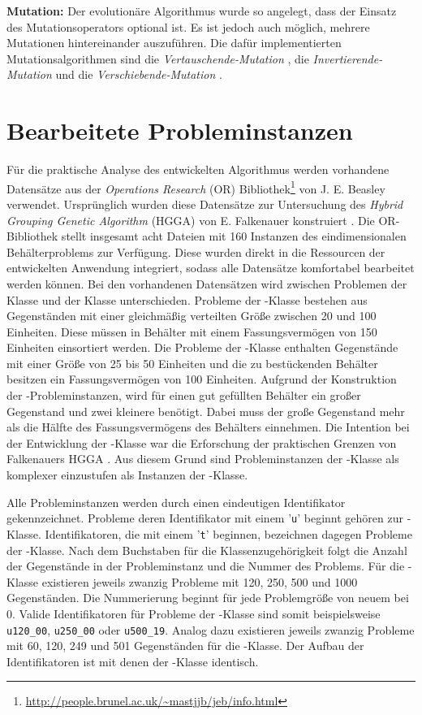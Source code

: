 \textbf{Mutation:} Der evolutionäre Algorithmus wurde so angelegt, dass der Einsatz des Mutationsoperators optional ist. Es ist jedoch auch möglich, mehrere Mutationen hintereinander auszuführen. Die dafür implementierten Mutationsalgorithmen sind die  
\textit{Vertauschende-Mutation} \parencite[27]{Weicker:2007}, die \textit{Invertierende-Mutation} \parencite[28]{Weicker:2007} und die \textit{Ver\-schie\-bende-Mutation} \parencite[132]{Weicker:2007}.


    \section{Bearbeitete Probleminstanzen}
    Für die praktische Analyse des entwickelten Algorithmus werden vorhandene Datensätze aus der \textit{Operations Research} (OR) Bibliothek\footnote{\url{http://people.brunel.ac.uk/~mastjjb/jeb/info.html}} von J. E. Beasley verwendet. Ursprünglich wurden diese Datensätze zur Untersuchung des \textit{Hybrid Grouping Genetic Algorithm} (HGGA) von E. Falkenauer konstruiert \parencite{Falkenauer:1996}. Die OR-Bibliothek stellt insgesamt acht Dateien mit 160 Instanzen des eindimensionalen Behälterproblems zur Verfügung. Diese wurden direkt in die Ressourcen der entwickelten Anwendung integriert, sodass alle Datensätze komfortabel bearbeitet werden können. Bei den vorhandenen Datensätzen wird zwischen Problemen der Klasse \uniform und der Klasse \triplets unterschieden. Probleme der \uniform-Klasse bestehen aus Gegenständen mit einer gleichmäßig verteilten Größe zwischen 20 und 100 Einheiten. Diese müssen in Behälter mit einem Fassungsvermögen von 150 Einheiten einsortiert werden. Die Probleme der \triplets-Klasse enthalten Gegenstände mit einer Größe von 25 bis 50 Einheiten und die zu bestückenden Behälter besitzen ein Fassungsvermögen von 100 Einheiten. Aufgrund der Konstruktion der \triplets-Probleminstanzen, wird für einen gut gefüllten Behälter ein großer Gegenstand und zwei kleinere benötigt. Dabei muss der große Gegenstand mehr als die Hälfte des Fassungsvermögens des Behälters einnehmen. Die Intention bei der Entwicklung der \triplets-Klasse war die Erforschung der praktischen Grenzen von Falkenauers HGGA \parencite[17]{Falkenauer:1996}. Aus diesem Grund sind Probleminstanzen der \triplets-Klasse als komplexer einzustufen als Instanzen der \uniform-Klasse.

    Alle Probleminstanzen werden durch einen eindeutigen Identifikator gekennzeichnet. Probleme deren Identifikator mit einem '\texttt{u}' beginnt gehören zur \uniform-Klasse. Identifikatoren, die mit einem '\texttt{t}' beginnen, bezeichnen dagegen Probleme der \triplets-Klasse. Nach dem Buchstaben für die Klassenzugehörigkeit folgt die Anzahl der Gegenstände in der Probleminstanz und die Nummer des Problems. Für die \uniform-Klasse existieren jeweils zwanzig Probleme mit 120, 250, 500 und 1000 Gegenständen. Die Nummerierung beginnt für jede Problemgröße von neuem bei 0. Valide Identifikatoren für Probleme der \uniform-Klasse sind somit beispielsweise \texttt{u120\_00}, \texttt{u250\_00} oder \texttt{u500\_19}. Analog dazu existieren jeweils zwanzig Probleme mit 60, 120, 249 und 501 Gegenständen für die \triplets-Klasse. Der Aufbau der Identifikatoren ist mit denen der \uniform-Klasse identisch.

